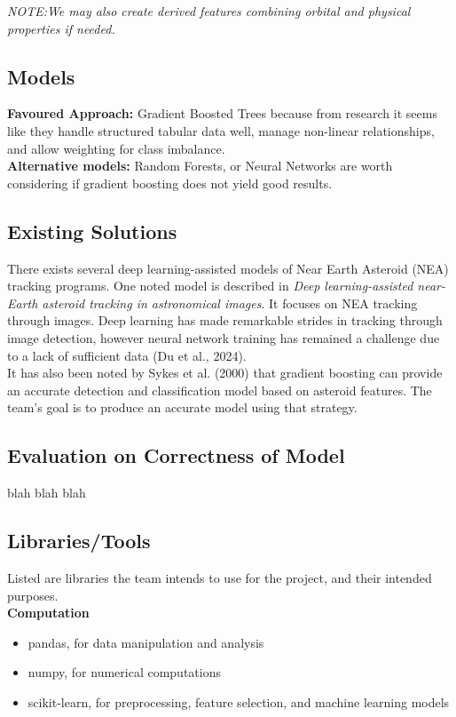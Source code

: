 \documentclass{article}
\begin{document}
\emph{NOTE:We may also create derived features combining orbital and physical properties if needed.}


\subsection*{Models}
\medskip
\textbf{Favoured Approach:} Gradient Boosted Trees because from research it seems like they handle structured tabular data well, manage non-linear relationships, and allow weighting for class imbalance. \\
\medskip
\textbf{Alternative models:} Random Forests, or Neural Networks are worth considering if gradient boosting does not yield good results.

\medskip

\subsection*{Existing Solutions}
\medskip
There exists several deep learning-assisted models of Near Earth Asteroid (NEA) tracking programs. One noted model is described in \textit{Deep learning-assisted near-Earth asteroid tracking in astronomical images}. It focuses on NEA tracking through images. Deep learning has made remarkable strides in tracking through image detection, however neural network training has remained a challenge due to a lack of sufficient data (Du et al., 2024). \\

It has also been noted by Sykes et al. (2000) that gradient boosting can provide an accurate detection and classification model based on asteroid features. The team's goal is to produce an accurate model using that strategy. 


\subsection*{Evaluation on Correctness of Model}

blah
blah
blah
\subsection*{Libraries/Tools}
Listed are libraries the team intends to use for the project, and their intended purposes. \\
\textbf{Computation}
\begin{itemize}
    \item pandas, for data manipulation and analysis
    \item numpy, for numerical computations
    \item scikit-learn, for preprocessing, feature selection, and machine learning models
\end{itemize}
\end{document}
